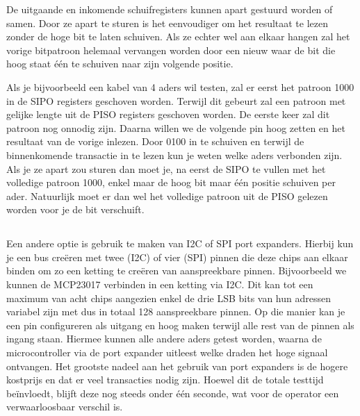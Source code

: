 De uitgaande en inkomende schuifregisters kunnen apart gestuurd worden of samen. Door ze apart te sturen is het eenvoudiger om het resultaat te lezen zonder de hoge bit te laten schuiven. Als ze echter wel aan elkaar hangen zal het vorige bitpatroon helemaal vervangen worden door een nieuw waar de bit die hoog staat één te schuiven naar zijn volgende positie.

Als je bijvoorbeeld een kabel van 4 aders wil testen, zal er eerst het patroon 1000 in de \gls{SIPO} registers geschoven worden. Terwijl dit gebeurt zal een patroon met gelijke lengte uit de \gls{PISO} registers geschoven worden. De eerste keer zal dit patroon nog onnodig zijn. Daarna willen we de volgende pin hoog zetten en het resultaat van de vorige inlezen. Door 0100 in te schuiven en terwijl de binnenkomende transactie in te lezen kun je weten welke aders verbonden zijn. Als je ze apart zou sturen dan moet je, na eerst de \gls{SIPO} te vullen met het volledige patroon 1000, enkel maar de hoog bit maar één positie schuiven per ader. Natuurlijk moet er dan wel het volledige patroon uit de \gls{PISO} gelezen worden voor je de bit verschuift.

\subsection{} 
\label{ssec:portexpanders}

Een andere optie is gebruik te maken van \gls{I2C} of \gls{SPI} port expanders. Hierbij kun je een bus creëren met twee (\gls{I2C}) of vier (\gls{SPI}) pinnen die deze chips aan elkaar binden om zo een ketting te creëren van aanspreekbare pinnen. Bijvoorbeeld we kunnen de MCP23017 \autocite{Microchip2016} verbinden in een ketting via \gls{I2C}. Dit kan tot een maximum van acht chips aangezien enkel de drie LSB bits van hun adressen variabel zijn met dus in totaal 128 aanspreekbare pinnen. Op die manier kan je een pin configureren als uitgang en hoog maken terwijl alle rest van de pinnen als ingang staan. Hiermee kunnen alle andere aders getest worden, waarna de microcontroller via de port expander uitleest welke draden het hoge signaal ontvangen. Het grootste nadeel aan het gebruik van port expanders is de hogere kostprijs en dat er veel transacties nodig zijn. Hoewel dit de totale testtijd beïnvloedt, blijft deze nog steeds onder één seconde, wat voor de operator een verwaarloosbaar verschil is.

\subsection{} 
\label{ssec:multiplexeric}


